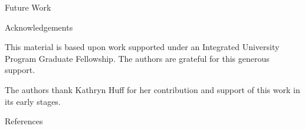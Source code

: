 \documentclass[final]{beamer}
\newlength{\onecolwid}
\newlength{\threecolwid}
\begin{document}
\begin{frame}[t]
\begin{columns}[t,totalwidth=\threecolwid]
\begin{column}{\onecolwid}
\begin{alertblock}{Future Work }
\end{alertblock}

%




\begin{block}{Acknowledgements}

	This material is based upon work supported under an Integrated University Program Graduate Fellowship. The authors are grateful for this generous support.

The authors thank Kathryn Huff for her contribution and support of this work in its early stages.
	
\end{block}



\begin{block}{References}

	{\footnotesize 
	}
\end{block}





\end{column} %

\end{columns} %

\end{frame} %
\end{document}
